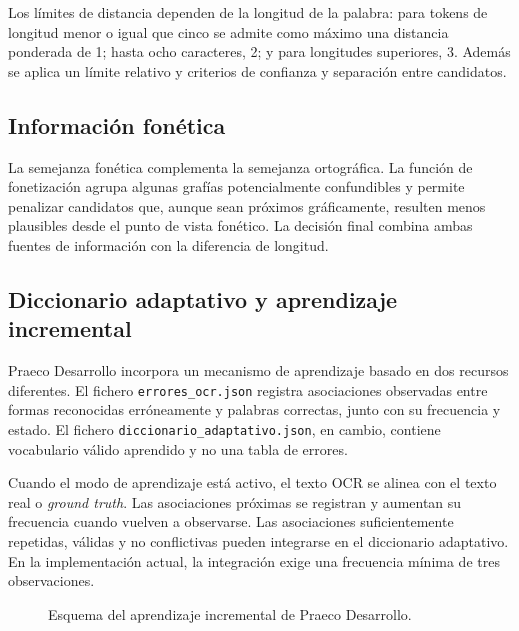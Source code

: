 Los límites de distancia dependen de la longitud de la palabra: para tokens de longitud menor o igual que cinco se admite como máximo una distancia ponderada de 1; hasta ocho caracteres, 2; y para longitudes superiores, 3. Además se aplica un límite relativo y criterios de confianza y separación entre candidatos.

\subsection{Información fonética}

La semejanza fonética complementa la semejanza ortográfica. La función de fonetización agrupa algunas grafías potencialmente confundibles y permite penalizar candidatos que, aunque sean próximos gráficamente, resulten menos plausibles desde el punto de vista fonético. La decisión final combina ambas fuentes de información con la diferencia de longitud.

\subsection{Diccionario adaptativo y aprendizaje incremental}

Praeco Desarrollo incorpora un mecanismo de aprendizaje basado en dos recursos diferentes. El fichero \texttt{errores\_ocr.json} registra asociaciones observadas entre formas reconocidas erróneamente y palabras correctas, junto con su frecuencia y estado. El fichero \texttt{diccionario\_adaptativo.json}, en cambio, contiene vocabulario válido aprendido y no una tabla de errores.

Cuando el modo de aprendizaje está activo, el texto OCR se alinea con el texto real o \textit{ground truth}. Las asociaciones próximas se registran y aumentan su frecuencia cuando vuelven a observarse. Las asociaciones suficientemente repetidas, válidas y no conflictivas pueden integrarse en el diccionario adaptativo. En la implementación actual, la integración exige una frecuencia mínima de tres observaciones.

\medskip

\begin{figure}[htbp]
	\centering
	\caption{Esquema del aprendizaje incremental de Praeco Desarrollo.}
	\label{fig:aprendizaje-praeco}
\end{figure}

